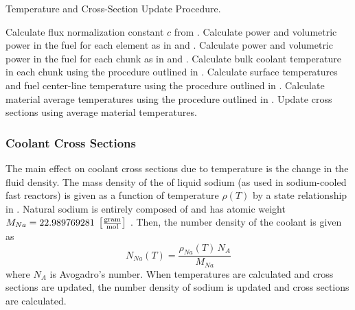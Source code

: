     \begin{algorithm}
      \caption{Temperature and Cross-Section Update Procedure.}
      \label{algorithm:temperature_update}
      \begin{algorithmic}[1]
        \State Calculate flux normalization constant $c$ from
          .
        \State Calculate power and volumetric power in the fuel for each element
          as in  and .
        \State Calculate power and volumetric power in the fuel for each chunk
          as in  and .
        \State Calculate bulk coolant temperature in each chunk using the 
          procedure outlined in .
        \State Calculate surface temperatures and fuel center-line temperature
          using the procedure outlined in .
        \State Calculate material average temperatures using the procedure 
          outlined in .
        \State Update cross sections using average material temperatures.
      \end{algorithmic}
    \end{algorithm}

    \subsubsection{Coolant Cross Sections}
      The main effect on coolant cross sections due to temperature is the change
      in the fluid density. The mass density of the of liquid sodium (as used in
      sodium-cooled fast reactors) is given as a function of temperature
      $\rho(T)$ by a state relationship in \cite{sodiumProp}. Natural sodium is
      entirely composed of  and has atomic weight $M_{Na} =
      22.989769281 \;\left[\text{{$\frac{\text{gram}}{\text{mol}}$}}\right]$ \cite{nuclides}.
      Then, the number density of the coolant is given as
      \begin{equation}
        \label{eq:number_density_sodium}
        N_{Na}(T) = \frac{\rho_{Na}(T) \, N_A}{M_{Na}}
      \end{equation}
      where $N_A$ is Avogadro's number. When temperatures are calculated and
      cross sections are updated, the number density of sodium is updated and
      cross sections are calculated. 
      
